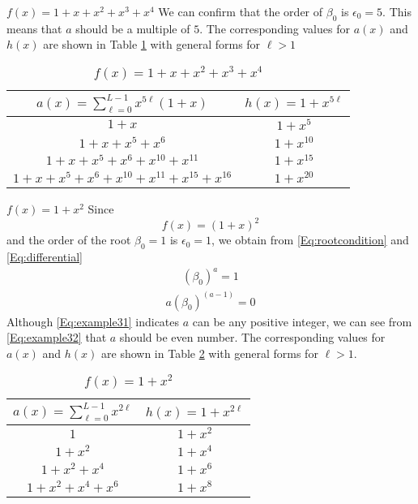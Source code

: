 \begin{example}
	$f(x)=1+x+x^2+x^3+x^4$\newline
	We can confirm that the order of $\beta_0$ is $\epsilon_0=5$. This means that $a$ should be a multiple of $5$. The corresponding values for $a(x)$ and $h(x)$ are shown in Table \ref{novelTab3} with general forms for $\ell>1$
	
	\begin{table}[htbp]
		\caption{$f(x)=1+x+x^2+x^3+x^4$}
		\centering
		\begin{tabular}{c c} 
			\hline
			$a(x)=\sum_{\ell=0}^{L-1} x^{5\ell}(1+x)$ & $h(x)=1+x^{5\ell}$  \\ [0.5ex] 
			\hline\hline
			$1+x$ &$1+x^5$\\ 
			$1+x+x^5+x^6$ &$1+x^{10}$  \\
			$1+x+x^5+x^6+x^{10}+x^{11}$ & $1+x^{15}$ \\
			$1+x+x^5+x^6+x^{10}+x^{11}+x^{15}+x^{16}$ &$1+x^{20}$  
		\end{tabular}
		\label{novelTab3}
	\end{table}
	\label{ex-2}
\end{example}

\begin{example}
	$f(x)=1+x^2$\newline
	Since 
	\[
	f(x)=(1+x)^2\]
	and the order of the root $\beta_0=1$ is $\epsilon_0=1$, we obtain from \eqref{Eq:rootcondition} and \eqref{Eq:differential}
	\begin{align}
	(\beta_0)^a = 1
	\label{Eq:example31}
	\end{align}
	\begin{align}
	a(\beta_0)^{(a-1)} = 0
	\label{Eq:example32}
	\end{align}	
	Although \eqref{Eq:example31} indicates $a$ can be any positive integer, we can see from \eqref{Eq:example32} that $a$ should be even number.
	The corresponding values for $a(x)$ and $h(x)$ are shown in Table \ref{novelTab1} with general forms for $\ell>1$.
	\begin{table}[htbp]
		\renewcommand{\arraystretch}{1.3}
		\caption{$f(x)=1+x^2$}
		\centering
		\begin{tabular}{c c } 
			\hline
			$a(x)=\sum_{\ell=0}^{L-1} x^{2\ell}$ & $h(x)=1+x^{2\ell}$ \\ [0.5ex] 
			\hline\hline
			$1$ & $1+x^2$\\ 
			$1+x^2$ & $1+x^4$ \\
			$1+x^2+x^4$ & $1+x^6$\\
			$1+x^2+x^4+x^6$ & $1+x^8$ 
		\end{tabular}
		\label{novelTab1}
	\end{table}
	\label{ex-3}
\end{example}



